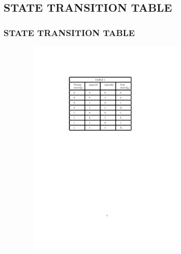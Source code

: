 \documentclass{beamer}
\numberwithin{equation}{section}
\begin{document}
\subsection{STATE TRANSITION TABLE}
\begin{frame}
\frametitle{STATE TRANSITION TABLE}

\begin{center}
\includegraphics[width=400,height=400]{STATE_TRANSITION_TABLE.pdf}
\end{center}


\end{frame}
\end{document}
